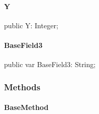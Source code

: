 \documentclass{report}
\begin{document}
\paragraph*{Y}\hspace*{\fill}

\begin{list}{}{
\setlength{\itemindent}{0cm}
\setlength{\listparindent}{0cm}
\setlength{\leftmargin}{\evensidemargin}
\addtolength{\leftmargin}{\tmplength}
\settowidth{\labelsep}{X}
\addtolength{\leftmargin}{\labelsep}
\setlength{\labelwidth}{\tmplength}
}
\begin{flushleft}
\item[\textbf{Declaration}\hfill]
\begin{ttfamily}
public Y: Integer;\end{ttfamily}


\end{flushleft}
\end{list}
\paragraph*{BaseField3}\hspace*{\fill}

\begin{list}{}{
\setlength{\itemindent}{0cm}
\setlength{\listparindent}{0cm}
\setlength{\leftmargin}{\evensidemargin}
\addtolength{\leftmargin}{\tmplength}
\settowidth{\labelsep}{X}
\addtolength{\leftmargin}{\labelsep}
\setlength{\labelwidth}{\tmplength}
}
\begin{flushleft}
\item[\textbf{Declaration}\hfill]
\begin{ttfamily}
public var BaseField3: String;\end{ttfamily}


\end{flushleft}
\end{list}
\subsubsection*{\large{\textbf{Methods}}\normalsize\hspace{1ex}\hfill}
\paragraph*{BaseMethod}\hspace*{\fill}
\end{document}
